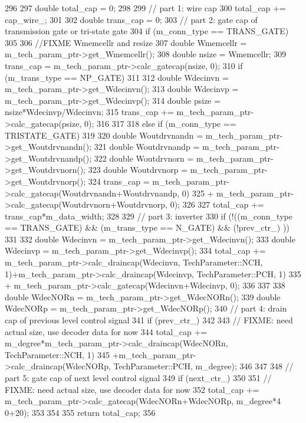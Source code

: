 \begin{DoxyCode}
296 {
297     double total_cap = 0;
298 
299     // part 1: wire cap
300     total_cap += cap_wire_;
301 
302     double trans_cap = 0;
303     // part 2: gate cap of transmission gate or tri-state gate
304     if (m_conn_type == TRANS_GATE)
305     {
306         //FIXME Wmemcellr and resize
307         double Wmemcellr = m_tech_param_ptr->get_Wmemcellr();
308         double nsize = Wmemcellr;
309         trans_cap = m_tech_param_ptr->calc_gatecap(nsize, 0);
310         if (m_trans_type == NP_GATE)
311         {
312             double Wdecinvn = m_tech_param_ptr->get_Wdecinvn();
313             double Wdecinvp = m_tech_param_ptr->get_Wdecinvp();
314             double psize = nsize*Wdecinvp/Wdecinvn;
315             trans_cap += m_tech_param_ptr->calc_gatecap(psize, 0);
316         }
317     }
318     else if (m_conn_type == TRISTATE_GATE)
319     {
320         double Woutdrvnandn = m_tech_param_ptr->get_Woutdrvnandn();
321         double Woutdrvnandp = m_tech_param_ptr->get_Woutdrvnandp();
322         double Woutdrvnorn = m_tech_param_ptr->get_Woutdrvnorn();
323         double Woutdrvnorp = m_tech_param_ptr->get_Woutdrvnorp();
324         trans_cap = m_tech_param_ptr->calc_gatecap(Woutdrvnandn+Woutdrvnandp, 0)
325             + m_tech_param_ptr->calc_gatecap(Woutdrvnorn+Woutdrvnorp, 0);
326     }
327     total_cap += trans_cap*m_data_width;
328 
329     // part 3: inverter
330     if (!((m_conn_type == TRANS_GATE) && (m_trans_type == N_GATE) && (!prev_ctr_)
      ))
331     {
332         double Wdecinvn = m_tech_param_ptr->get_Wdecinvn();
333         double Wdecinvp = m_tech_param_ptr->get_Wdecinvp();
334         total_cap += m_tech_param_ptr->calc_draincap(Wdecinvn, 
      TechParameter::NCH, 1)+m_tech_param_ptr->calc_draincap(Wdecinvp, 
      TechParameter::PCH, 1)
335             + m_tech_param_ptr->calc_gatecap(Wdecinvn+Wdecinvp, 0);
336     }
337 
338     double WdecNORn = m_tech_param_ptr->get_WdecNORn();
339     double WdecNORp = m_tech_param_ptr->get_WdecNORp();
340     // part 4: drain cap of previous level control signal
341     if (prev_ctr_)
342     {
343         // FIXME: need actual size, use decoder data for now
344         total_cap += m_degree*m_tech_param_ptr->calc_draincap(WdecNORn, 
      TechParameter::NCH, 1)
345             +m_tech_param_ptr->calc_draincap(WdecNORp, TechParameter::PCH, 
      m_degree);
346     }
347 
348     // part 5: gate cap of next level control signal
349     if (next_ctr_)
350     {
351         // FIXME: need actual size, use decoder data for now
352         total_cap += m_tech_param_ptr->calc_gatecap(WdecNORn+WdecNORp, m_degree*4
      0+20);
353     }
354 
355     return total_cap;
356 }
\end{DoxyCode}
